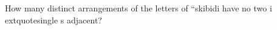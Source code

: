 How many distinct arrangements of the letters of ``skibidi have no two i	extquotesingle s adjacent?
